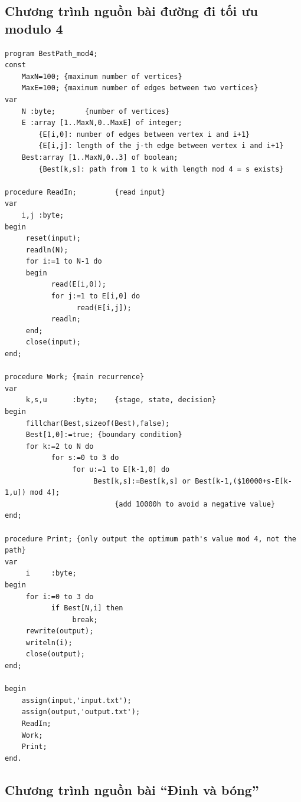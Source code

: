 \documentclass[11pt]{article}
\begin{document}
\subsection{Chương trình nguồn bài đường đi tối ưu modulo 4}

\begin{verbatim}
program BestPath_mod4;
const
    MaxN=100; {maximum number of vertices}
    MaxE=100; {maximum number of edges between two vertices}
var
    N :byte;       {number of vertices}
    E :array [1..MaxN,0..MaxE] of integer;
        {E[i,0]: number of edges between vertex i and i+1}
        {E[i,j]: length of the j-th edge between vertex i and i+1}
    Best:array [1..MaxN,0..3] of boolean;
        {Best[k,s]: path from 1 to k with length mod 4 = s exists}

procedure ReadIn;         {read input}
var
    i,j :byte;
begin
     reset(input);
     readln(N);
     for i:=1 to N-1 do
     begin
           read(E[i,0]);
           for j:=1 to E[i,0] do
                 read(E[i,j]);
           readln;
     end;
     close(input);
end;

procedure Work; {main recurrence}
var
     k,s,u      :byte;    {stage, state, decision}
begin
     fillchar(Best,sizeof(Best),false);
     Best[1,0]:=true; {boundary condition}
     for k:=2 to N do
           for s:=0 to 3 do
                for u:=1 to E[k-1,0] do
                     Best[k,s]:=Best[k,s] or Best[k-1,($10000+s-E[k-1,u]) mod 4];
                          {add 10000h to avoid a negative value}
end;

procedure Print; {only output the optimum path's value mod 4, not the path}
var
     i     :byte;
begin
     for i:=0 to 3 do
           if Best[N,i] then
                break;
     rewrite(output);
     writeln(i);
     close(output);
end;

begin
    assign(input,'input.txt');
    assign(output,'output.txt');
    ReadIn;
    Work;
    Print;
end.
\end{verbatim}

\subsection{Chương trình nguồn bài ``Đinh và bóng''}
\end{document}
